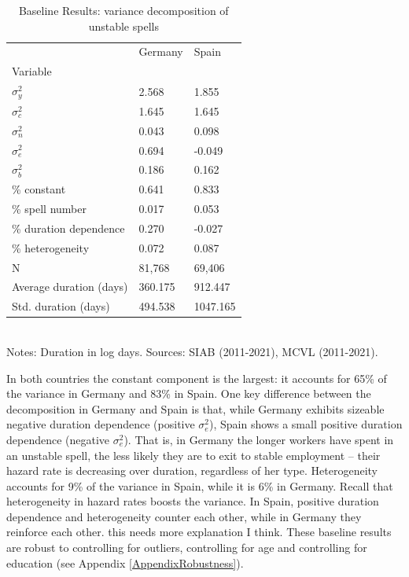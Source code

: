 \documentclass[12pt]{article}
\theoremstyle{definition}
\theoremstyle{remark}
\begin{document}
\begin{table}[htbb!]
\caption{Baseline Results: variance decomposition of unstable spells}
    \centering
\begin{tabular}{lll}
\toprule
 & Germany & Spain \\
Variable &  &  \\
\midrule
$\sigma^{2}_y$ & 2.568 & 1.855 \\
$\sigma^{2}_c$ & 1.645 & 1.645 \\
$\sigma^{2}_n$ & 0.043 & 0.098 \\
$\sigma^{2}_e$ & 0.694 & -0.049 \\
$\sigma^{2}_b$ & 0.186 & 0.162 \\
\midrule
\% constant & 0.641 & 0.833 \\
\% spell number & 0.017 & 0.053 \\
\% duration dependence & 0.270 & -0.027 \\
\% heterogeneity & 0.072 & 0.087 \\
\hline \hline
N & 81,768 & 69,406 \\
Average duration (days) & 360.175 & 912.447 \\
Std. duration (days) & 494.538 & 1047.165 \\
\bottomrule
\end{tabular}
\label{tab:results_main}
\smallskip
\footnotesize \\
Notes: Duration in log days. Sources: SIAB  (2011-2021), MCVL (2011-2021). \end{table}

In both countries the constant component is the largest: it accounts for 65\% of the variance in Germany and 83\% in Spain.
One key difference between the decomposition in Germany and Spain is that, while Germany exhibits sizeable negative duration dependence (positive $\sigma^{2}_e$), Spain shows a small positive duration dependence (negative $\sigma^{2}_e$). That is, in Germany the longer workers have spent in an unstable spell, the less likely they are to exit to stable employment -- their hazard rate is decreasing over duration, regardless of her type.
Heterogeneity accounts for 9\% of the  variance in Spain, while it is 6\% in Germany. Recall that heterogeneity in hazard rates boosts the variance. In Spain, positive duration dependence and heterogeneity counter each other, while in Germany they reinforce each other. \textcolor{mygreen}{this needs more explanation I think.} These baseline results are robust to controlling for outliers, controlling for age and controlling for education (see Appendix \ref{AppendixRobustness}). 
\end{document}
